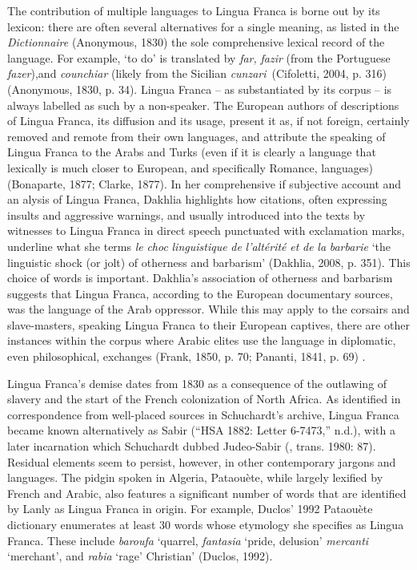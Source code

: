 \documentclass[output=paper]{langsci/langscibook}
\begin{document}
The contribution of multiple languages to Lingua Franca is borne out by its lexicon: there are often several alternatives for a single meaning, as listed in the \textit{Dictionnaire} (Anonymous, 1830) the sole comprehensive lexical record of the language. For example, ‘to do’ is translated by \textit{far,} \textit{fazir} (from the Portuguese \textit{fazer}),and \textit{counchiar} (likely from the Sicilian \textit{cunzari}~(Cifoletti, 2004, p. 316)(Anonymous, 1830, p. 34). Lingua Franca – as substantiated by its corpus – is always labelled as such by a non-speaker. The European authors of descriptions of Lingua Franca, its diffusion and its usage, present it as, if not foreign, certainly removed and remote from their own languages, and attribute the speaking of Lingua Franca to the Arabs and Turks (even if it is clearly a language that lexically is much closer to European, and specifically Romance, languages) (Bonaparte, 1877; Clarke, 1877). In her comprehensive if subjective account and an  alysis of Lingua Franca, Dakhlia highlights how citations, often expressing insults and aggressive warnings, and usually introduced into the texts by witnesses to Lingua Franca in direct speech punctuated with exclamation marks, underline what she terms \textit{le} \textit{choc} \textit{linguistique} \textit{de} \textit{l’altérité} \textit{et} \textit{de} \textit{la} \textit{barbarie} ‘the linguistic shock (or jolt) of otherness and barbarism’ (Dakhlia, 2008, p. 351). This choice of words is important. Dakhlia’s association of otherness and barbarism suggests that Lingua Franca, according to the European documentary sources, was the language of the Arab oppressor. While this may apply to the corsairs and slave-masters, speaking Lingua Franca to their European captives, there are other instances within the corpus where Arabic elites use the language in diplomatic, even philosophical, exchanges (Frank, 1850, p. 70; Pananti, 1841, p. 69) .

Lingua Franca’s demise dates from 1830 as a consequence of the outlawing of slavery and the start of the French colonization of North Africa. As identified in correspondence from well-placed sources in Schuchardt’s archive, Lingua Franca became known alternatively as Sabir (“HSA 1882: Letter 6-7473,” n.d.), with a later incarnation which Schuchardt dubbed Judeo-Sabir (\citealt{Schuchardt1909}, trans. 1980: 87). Residual elements seem to persist, however, in other contemporary jargons and languages. The pidgin spoken in Algeria, Pataouète, while largely lexified by French and Arabic, also features a significant number of words that are identified by Lanly as Lingua Franca in origin. For example, Duclos’ 1992 Pataouète dictionary enumerates at least 30 words whose etymology she specifies as Lingua Franca. These include \textit{baroufa} ‘quarrel, \textit{fantasia} ‘pride, delusion’ \textit{mercanti} ‘merchant’, and \textit{rabia} ‘rage’ Christian’ (Duclos, 1992).
\end{document}
